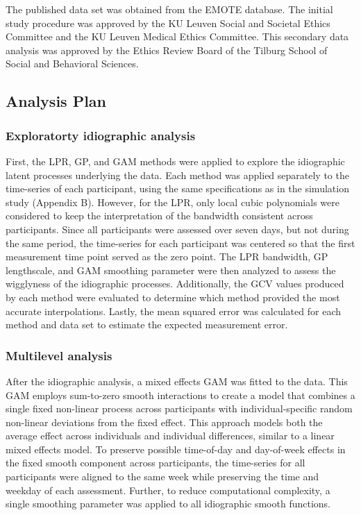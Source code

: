 \documentclass[man, floatsintext]{apa7}
\begin{document}
The published data set was obtained from the EMOTE database. The initial study
procedure was approved by the KU Leuven Social and Societal Ethics Committee
and the KU Leuven Medical Ethics Committee. This secondary data analysis was
approved by the Ethics Review Board of the Tilburg School of Social and
Behavioral Sciences.

\subsection{Analysis Plan}

\subsubsection{Exploratorty idiographic analysis}

First, the LPR, GP, and GAM methods were applied to explore the idiographic
latent processes underlying the data. Each method was applied separately to the
time-series of each participant, using the same specifications as in the
simulation study (Appendix B). However, for the LPR, only local cubic
polynomials were
considered to keep the interpretation of the bandwidth consistent across
participants.
Since all participants were assessed over seven days, but not during the same
period, the time-series for each participant was centered so that the first
measurement time point served as the zero point. The LPR bandwidth, GP
lengthscale, and GAM smoothing parameter were then analyzed to assess the
wigglyness of the idiographic processes. Additionally, the GCV values produced
by each method were evaluated to determine which method provided the most
accurate interpolations. Lastly, the mean squared error was calculated for each
method and data set to estimate the expected measurement error.

\subsubsection{Multilevel analysis}

After the idiographic analysis, a mixed effects GAM was fitted to the data.
This GAM employs sum-to-zero smooth interactions to create a model that
combines a single fixed non-linear process across participants with
individual-specific random non-linear deviations from the fixed effect. This
approach models both the average effect across individuals and individual
differences, similar to a linear mixed effects model. To preserve possible
time-of-day and day-of-week effects in the fixed smooth component across
participants, the time-series for all participants were aligned to the same
week while preserving the time and weekday of each assessment. Further, to
reduce computational complexity, a single smoothing parameter was applied to
all idiographic smooth functions.
\end{document}
